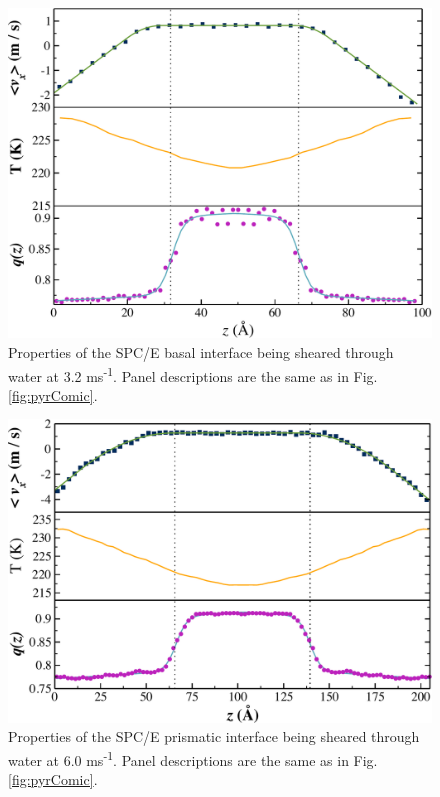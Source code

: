 \begin{figure}
\includegraphics[width=\linewidth]{Figures/Bas_comic_strip}
\caption{\label{fig:bComic} Properties of the SPC/E basal interface being
  sheared through water at 3.2 ms\textsuperscript{-1}.  Panel
  descriptions are the same as in Fig. \ref{fig:pyrComic}.}
\end{figure}

\begin{figure}
\includegraphics[width=\linewidth]{Figures/Pri_comic_strip}
\caption{\label{fig:pComic} Properties of the SPC/E prismatic interface
  being sheared through water at 6.0 ms\textsuperscript{-1}.  Panel
  descriptions are the same as in Fig. \ref{fig:pyrComic}.}
\end{figure}


